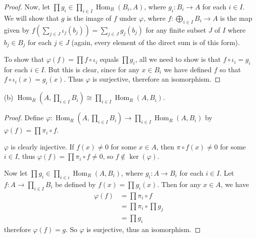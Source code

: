 \documentclass[10pt]{article}
\DeclareMathOperator*{\Hom}{Hom}
\begin{document}
\begin{enumerate}
\begin{proof}
Now, let $\prod g_i \in \prod_{i \in I} \Hom_R(B_i,A)$, where $g_i: B_i \rightarrow A$ for each $i \in I$.  We will show that $g$ is the image of $f$ under $\varphi$, where $f: \bigoplus_{i \in I} B_i \rightarrow A$ is the map given by $f(\sum_{j \in J} \iota_j(b_j)) = \sum_{j \in J} g_j(b_j)$ for any finite subset $J$ of $I$ where $b_j \in B_j$ for each $j \in J$ (again, every element of the direct sum is of this form).

To show that $\varphi(f) = \prod f \circ \iota_i$ equals $\prod g_i$, all we need to show is that $f \circ \iota_i = g_i$ for each $i \in I$.  But this is clear, since for any $x \in B_i$ we have defined $f$ so that $f \circ \iota_i(x) = g_i(x)$.  Thus $\varphi$ is surjective, therefore an isomorphism.
\end{proof}

(b) $\Hom_R(A, \prod_{i \in I} B_i) \cong \prod_{i \in I} \Hom_R(A,B_i)$.

\begin{proof}
Define $\varphi:\Hom_R(A, \prod_{i \in I} B_i) \rightarrow \prod_{i \in I} \Hom_R(A,B_i)$ by $\varphi(f) = \prod \pi_i \circ f$.

$\varphi$ is clearly injective.  If $f(x) \neq 0$ for some $x \in A$, then $\pi \circ f(x) \neq 0$ for some $i \in I$, thus $\varphi(f) = \prod \pi_i \circ f \neq 0$, so $f \not \in \ker (\varphi)$.

Now let $\prod g_i \in \prod_{i \in i} \Hom_R(A,B_i)$, where $g_i : A \rightarrow B_i$ for each $i \in I$.  Let $f: A \rightarrow \prod_{i \in I} B_i$ be defined by $f(x) = \prod g_i(x)$.  Then for any $x \in A$, we have 
\begin{align*}
\varphi(f)
&=
\prod \pi_i \circ f 
\\
&=\prod \pi_i \circ \prod g_j
\\
&= \prod g_i
\end{align*}
therefore $\varphi(f) = g$.  So $\varphi$ is surjective, thus an isomorphism.
\end{proof}

\end{enumerate}
\end{document}

